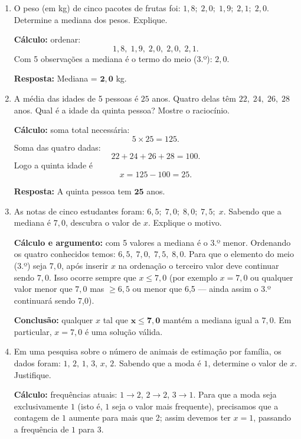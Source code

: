 \documentclass[11pt]{article}
\begin{document}
\begin{enumerate}
\item O peso (em kg) de cinco pacotes de frutas foi: $1{,}8;\;2{,}0;\;1{,}9;\;2{,}1;\;2{,}0$.  
Determine a mediana dos pesos. Explique.

\textbf{Cálculo:} ordenar:
\[
1{,}8,\;1{,}9,\;2{,}0,\;2{,}0,\;2{,}1.
\]
Com 5 observações a mediana é o termo do meio (3.º): \(2{,}0\).

\textbf{Resposta:} Mediana = \(\mathbf{2{,}0}\) kg.

\bigskip

\item A média das idades de 5 pessoas é $25$ anos. Quatro delas têm $22,\;24,\;26,\;28$ anos.  
Qual é a idade da quinta pessoa? Mostre o raciocínio.

\textbf{Cálculo:} soma total necessária:
\[
5 \times 25 = 125.
\]
Soma das quatro dadas:
\[
22 + 24 + 26 + 28 = 100.
\]
Logo a quinta idade é
\[
x = 125 - 100 = 25.
\]

\textbf{Resposta:} A quinta pessoa tem \(\mathbf{25}\) anos.

\bigskip

\item As notas de cinco estudantes foram: $6{,}5;\;7{,}0;\;8{,}0;\;7{,}5;\;x$.  
Sabendo que a mediana é $7{,}0$, descubra o valor de $x$. Explique o motivo.

\textbf{Cálculo e argumento:} com 5 valores a mediana é o 3.º menor. Ordenando os quatro conhecidos temos: \(6{,}5,\;7{,}0,\;7{,}5,\;8{,}0\). Para que o elemento do meio (3.º) seja \(7{,}0\), após inserir \(x\) na ordenação o terceiro valor deve continuar sendo \(7{,}0\). Isso ocorre sempre que \(x \le 7{,}0\) (por exemplo \(x=7{,}0\) ou qualquer valor menor que \(7{,}0\) mas $\ge 6{,}5$ ou menor que 6{,}5 — ainda assim o 3.º continuará sendo 7{,}0).  

\textbf{Conclusão:} qualquer \(x\) tal que \(\mathbf{x \le 7{,}0}\) mantém a mediana igual a \(7{,}0\). Em particular, \(x=7{,}0\) é uma solução válida.

\bigskip

\item Em uma pesquisa sobre o número de animais de estimação por família, os dados foram: $1,\,2,\,1,\,3,\,x,\,2$.  
Sabendo que a moda é $1$, determine o valor de $x$. Justifique.

\textbf{Cálculo:} frequências atuais: \(1\to2\), \(2\to2\), \(3\to1\). Para que a moda seja exclusivamente \(1\) (isto é, \(1\) seja o valor mais frequente), precisamos que a contagem de \(1\) aumente para mais que 2; assim devemos ter \(x=1\), passando a frequência de \(1\) para 3.


\end{enumerate}
\end{document}
